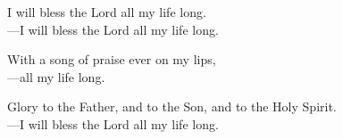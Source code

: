 \responsory

\noindent I will bless the Lord all my life long.\\
{\color{red}---\thinspace}I will bless the Lord all my life long.

\medskip\noindent With a song of praise ever on my lips,\\
{\color{red}---\thinspace}all my life long.

\medskip\noindent Glory to the Father, and to the Son, and to the Holy Spirit.\\
{\color{red}---\thinspace}I will bless the Lord all my life long.